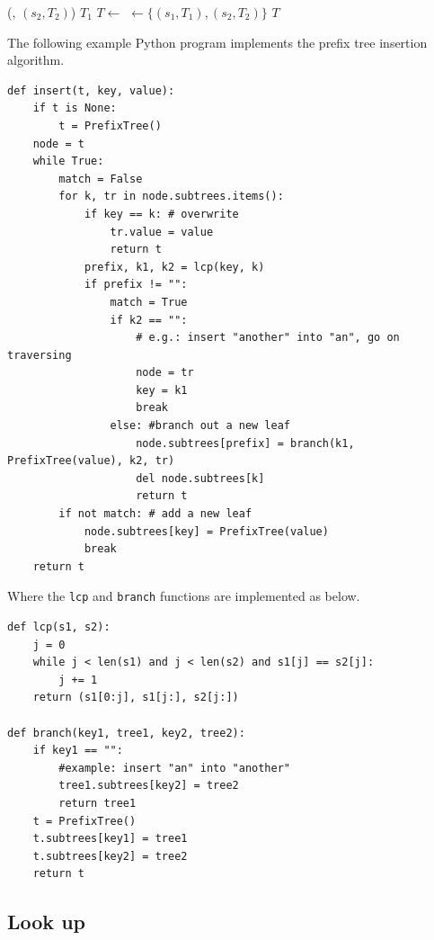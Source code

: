 \documentclass[b5paper]{article}
\begin{document}
\begin{algorithmic}[1]
    \State {}(, $(s_2, T_2)$)
    \State \Return $T_1$
  \EndIf
  \State $T \gets$ 
  \State {} $\gets \{(s_1, T_1), (s_2, T_2)\}$
  \State \Return $T$
\EndFunction
\end{algorithmic}

The following example Python program implements the prefix tree insertion algorithm.

\lstset{language=Python}
\begin{lstlisting}
def insert(t, key, value):
    if t is None:
        t = PrefixTree()
    node = t
    while True:
        match = False
        for k, tr in node.subtrees.items():
            if key == k: # overwrite
                tr.value = value
                return t
            prefix, k1, k2 = lcp(key, k)
            if prefix != "":
                match = True
                if k2 == "":
                    # e.g.: insert "another" into "an", go on traversing
                    node = tr
                    key = k1
                    break
                else: #branch out a new leaf
                    node.subtrees[prefix] = branch(k1, PrefixTree(value), k2, tr)
                    del node.subtrees[k]
                    return t
        if not match: # add a new leaf
            node.subtrees[key] = PrefixTree(value)
            break
    return t
\end{lstlisting}

Where the \texttt{lcp} and \texttt{branch} functions are implemented as below.

\begin{lstlisting}
def lcp(s1, s2):
    j = 0
    while j < len(s1) and j < len(s2) and s1[j] == s2[j]:
        j += 1
    return (s1[0:j], s1[j:], s2[j:])

def branch(key1, tree1, key2, tree2):
    if key1 == "":
        #example: insert "an" into "another"
        tree1.subtrees[key2] = tree2
        return tree1
    t = PrefixTree()
    t.subtrees[key1] = tree1
    t.subtrees[key2] = tree2
    return t
\end{lstlisting}


\subsection{Look up}
\end{document}
